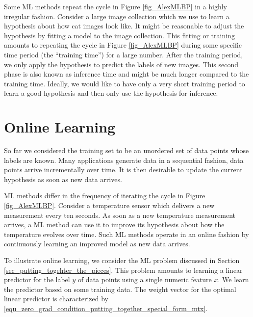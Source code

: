 \documentclass[12pt]{report}
\begin{document}
Some ML methods repeat the cycle in Figure \ref{fig_AlexMLBP} in a 
highly irregular fashion. Consider a large image collection which we 
use to learn a hypothesis about how cat images look like. It might 
be reasonable to adjust the hypothesis by fitting a model to the image 
collection. This fitting or training amounts to repeating the cycle in Figure \ref{fig_AlexMLBP} 
during some specific time period (the ``training time'') for a large number. After the training period, 
we only apply the hypothesis to predict the labels of new images. This second phase is also known 
as inference time and might be much longer compared to the training time. Ideally, we would like 
to have only a very short training period to learn a good hypothesis and then only use the hypothesis 
for inference. 

\section{Online Learning} 
\label{sec_online_learning}

So far we considered the training set to be an unordered set of data points 
whose labels are known. Many applications generate data in a sequential 
fashion, data points arrive incrementally over time. It is then desirable to update 
the current hypothesis as soon as new data arrives. 

ML methods differ in the frequency of iterating the cycle in Figure \ref{fig_AlexMLBP}. Consider a 
temperature sensor which delivers a new measurement every ten seconds. As soon as a new 
temperature measurement arrives, a ML method can use it to improve its hypothesis about 
how the temperature evolves over time. Such ML methods operate in an online fashion by 
continuously learning an improved model as new data arrives.  

To illustrate online learning, we consider the ML problem discussed in Section \ref{sec_putting_togehter_the_pieces}. 
This problem amounts to learning a linear predictor for the label $y$ of data points 
using a single numeric feature $x$. We learn the predictor based on some training 
data. The weight vector for the optimal linear predictor is characterized by \eqref{equ_zero_grad_condition_putting_together_special_form_mtx}. 
\end{document}
